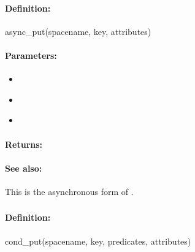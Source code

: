 \paragraph{Definition:}
\begin{rubycode}
async_put(spacename, key, attributes)
\end{rubycode}

\paragraph{Parameters:}
\begin{itemize}[noitemsep]
\item {}\\

\item {}\\

\item {}\\

\end{itemize}

\paragraph{Returns:}


\paragraph{See also:}  This is the asynchronous form of .

\pagebreak
\subsubsection{}
\label{api:ruby:cond_put}


\paragraph{Definition:}
\begin{rubycode}
cond_put(spacename, key, predicates, attributes)
\end{rubycode}

